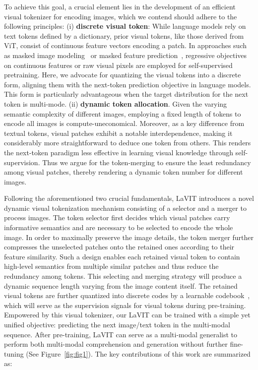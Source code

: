 To achieve this goal, a crucial element lies in the development of an efficient visual tokenizer for encoding images, which we contend should adhere to the following principles: (i) \textbf{discrete visual token}: While language models rely on text tokens defined by a dictionary, prior visual tokens, like those derived from ViT, consist of continuous feature vectors encoding a patch. In approaches such as masked image modeling~\citep{HeCXLDG22} or masked feature prediction~\citep{00050XWYF22}, regressive objectives on continuous features or raw visual pixels are employed for self-supervised pretraining. Here, we advocate for quantizing the visual tokens into a discrete form, aligning them with the next-token prediction objective in language models. This form is particularly advantageous when the target distribution for the next token is multi-mode. (ii) \textbf{dynamic token allocation}. Given the varying semantic complexity of different images, employing a fixed length of tokens to encode all images is compute-uneconomical. Moreover, as a key difference from textual tokens, visual patches exhibit a notable interdependence, making it considerably more straightforward to deduce one token from others. This renders the next-token paradigm less effective in learning visual knowledge through self-supervision. Thus we argue for the token-merging to ensure the least redundancy among visual patches, thereby rendering a dynamic token number for different images.

Following the aforementioned two crucial fundamentals, LaVIT introduces a novel dynamic visual tokenization mechanism consisting of a selector and a merger to process images. The token selector first decides which visual patches carry informative semantics and are necessary to be selected to encode the whole image. In order to maximally preserve the image details, the token merger further compresses the unselected patches onto the retained ones according to their feature similarity. Such a design enables each retained visual token to contain high-level semantics from multiple similar patches and thus reduce the redundancy among tokens. This selecting and merging strategy will produce a dynamic sequence length varying from the image content itself. The retained visual tokens are further quantized into discrete codes by a learnable codebook~\citep{esser2021taming}, which will serve as the supervision signals for visual tokens during pre-training. Empowered by this visual tokenizer, our LaVIT can be trained with a simple yet unified objective: predicting the next image/text token in the multi-modal sequence. After pre-training, LaVIT can serve as a multi-modal generalist to perform both multi-modal comprehension and generation without further fine-tuning (See Figure~\ref{fig:fig1}). The key contributions of this work are summarized as: 

